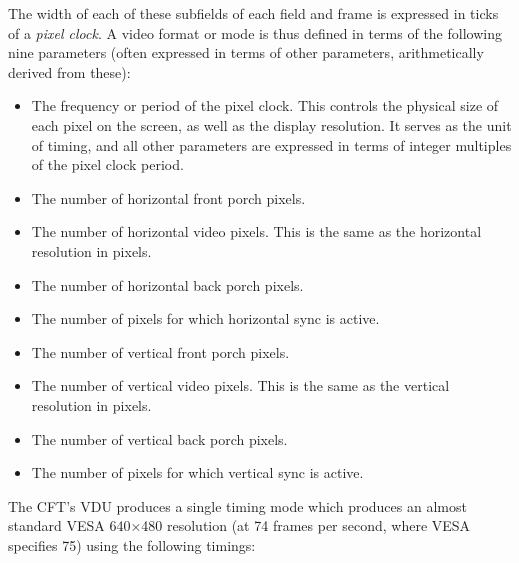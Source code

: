 The width of each of these subfields of each field and frame is expressed in
ticks of a {\em pixel clock\/}. A video format or mode is thus defined in terms
of the following nine parameters (often expressed in terms of other parameters,
arithmetically derived from these):

\begin{itemize}
\item The frequency or period of the pixel clock. This controls the physical size of each pixel on the screen, as well as the display resolution. It serves as the unit of timing, and all other parameters are expressed in terms of integer multiples of the pixel clock period.
\item The number of horizontal front porch pixels.
\item The number of horizontal video pixels. This is the same as the horizontal resolution in pixels.
\item The number of horizontal back porch pixels.
\item The number of pixels for which horizontal sync is active.
\item The number of vertical front porch pixels.
\item The number of vertical video pixels. This is the same as the vertical resolution in pixels.
\item The number of vertical back porch pixels.
\item The number of pixels for which vertical sync is active.
\end{itemize}

The CFT's VDU produces a single timing mode which produces an almost standard
VESA 640×480 resolution (at 74 frames per second, where VESA specifies 75)
using the following timings:


